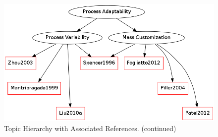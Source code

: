 \begin{figure}[!htb]
\begin{center}
        \includegraphics[width=0.6\linewidth]{Figures/topics4.png}
\caption{Topic Hierarchy with Associated References. (continued)}
\label{fig:refGraphC}
\end{center}
\end{figure}
\pagebreak